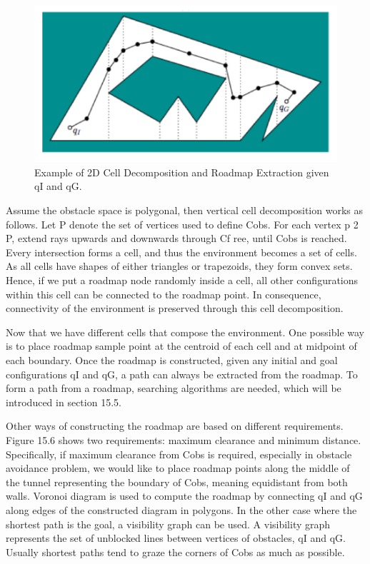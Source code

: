 \documentclass[twoside]{article}
\begin{document}
\begin{figure}[h]
\begin{center}
\includegraphics{fig15_5.PNG}
\caption{Example of 2D Cell Decomposition and Roadmap Extraction given qI and qG.}
\end{center}
\end{figure}

Assume the obstacle space is polygonal, then vertical cell decomposition works as follows. Let P denote the set of vertices used to define Cobs. For each vertex p 2 P, extend rays upwards and downwards through Cf ree, until Cobs is reached. Every intersection forms a cell, and thus the environment becomes a set of cells. As all cells have shapes of either triangles or trapezoids, they form convex sets. Hence, if
we put a roadmap node randomly inside a cell, all other configurations within this cell can be connected to the roadmap point. In consequence, connectivity of the environment is preserved through this cell decomposition.

Now that we have different cells that compose the environment. One possible way is to place roadmap sample point at the centroid of each cell and at midpoint of each boundary. Once the roadmap is constructed, given any initial and goal configurations qI and qG, a path can always be extracted from the roadmap. To form a path from a roadmap, searching algorithms are needed, which will be introduced in section 15.5.

Other ways of constructing the roadmap are based on different requirements. Figure 15.6 shows two requirements: maximum clearance and minimum distance. Specifically, if maximum clearance from Cobs is required, especially in obstacle avoidance problem, we would like to place roadmap points along the middle of the tunnel representing the boundary of Cobs, meaning equidistant from both walls. Voronoi diagram is used to compute the roadmap by connecting qI and qG along edges of the constructed diagram in polygons. In the other case where the shortest path is the goal, a visibility graph can be used. A
visibility graph represents the set of unblocked lines between vertices of obstacles, qI and qG. Usually shortest paths tend to graze the corners of Cobs as much as possible.
\end{document}
